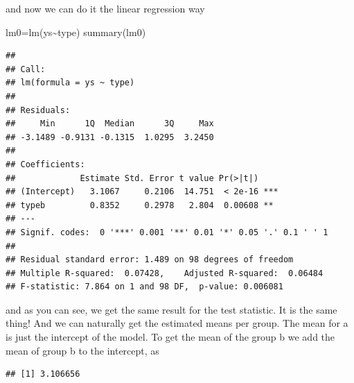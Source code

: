 \documentclass[
]{book}
\newenvironment{Shaded}{\begin{snugshade}}{\end{snugshade}}
\newcommand{\CommentTok}[1]{\textcolor[rgb]{0.56,0.35,0.01}{\textit{#1}}}
\newcommand{\DecValTok}[1]{\textcolor[rgb]{0.00,0.00,0.81}{#1}}
\newcommand{\FunctionTok}[1]{\textcolor[rgb]{0.00,0.00,0.00}{#1}}
\newcommand{\NormalTok}[1]{#1}
\newcommand{\OtherTok}[1]{\textcolor[rgb]{0.56,0.35,0.01}{#1}}
\newcommand{\SpecialCharTok}[1]{\textcolor[rgb]{0.00,0.00,0.00}{#1}}
\begin{document}
and now we can do it the linear regression way

\begin{Shaded}
\begin{Highlighting}[]
\NormalTok{lm0}\OtherTok{=}\FunctionTok{lm}\NormalTok{(ys}\SpecialCharTok{\textasciitilde{}}\NormalTok{type)}
\FunctionTok{summary}\NormalTok{(lm0)}
\end{Highlighting}
\end{Shaded}

\begin{verbatim}
## 
## Call:
## lm(formula = ys ~ type)
## 
## Residuals:
##     Min      1Q  Median      3Q     Max 
## -3.1489 -0.9131 -0.1315  1.0295  3.2450 
## 
## Coefficients:
##             Estimate Std. Error t value Pr(>|t|)    
## (Intercept)   3.1067     0.2106  14.751  < 2e-16 ***
## typeb         0.8352     0.2978   2.804  0.00608 ** 
## ---
## Signif. codes:  0 '***' 0.001 '**' 0.01 '*' 0.05 '.' 0.1 ' ' 1
## 
## Residual standard error: 1.489 on 98 degrees of freedom
## Multiple R-squared:  0.07428,    Adjusted R-squared:  0.06484 
## F-statistic: 7.864 on 1 and 98 DF,  p-value: 0.006081
\end{verbatim}

and as you can see, we get the same result for the test statistic. It is the same thing! And we can naturally get the estimated means per group. The mean for a is just the intercept of the model. To get the mean of the group b we add the mean of group b to the intercept, as

\begin{Shaded}
\end{Shaded}

\begin{verbatim}
## [1] 3.106656
\end{verbatim}

\begin{Shaded}
\end{Shaded}
\end{document}
